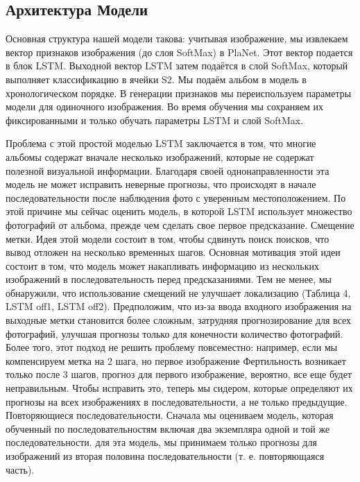 \subsection{Архитектура Модели}
Основная структура нашей модели такова:
учитывая изображение, мы извлекаем вектор признаков изображения (до слоя SoftMax) в PlaNet. Этот вектор подается в блок LSTM. Выходной вектор LSTM затем подаётся в слой SoftMax, который
выполняет классификацию в ячейки S2. Мы подаём альбом в модель в хронологическом порядке. В генерации признаков мы переиспользуем параметры модели для одиночного изображения. Во время обучения мы сохраняем их фиксированными и только обучать параметры LSTM и слой SoftMax.


Проблема с этой простой моделью LSTM заключается в том, что многие
альбомы содержат вначале несколько изображений, которые
не содержат полезной визуальной информации. Благодаря своей однонаправленности эта модель не может исправить неверные прогнозы, что
происходят в начале последовательности после наблюдения
фото с уверенным местоположением. По этой причине мы сейчас
оценить модель, в которой LSTM использует множество фотографий
от альбома, прежде чем сделать свое первое предсказание.
Смещение метки. Идея этой модели состоит в том, чтобы сдвинуть 
поиск поисков, что вывод отложен на несколько временных шагов. Основная мотивация этой идеи состоит в том, что
модель может накапливать информацию из нескольких изображений в
последовательность перед предсказаниями. Тем не менее, мы
обнаружили, что использование смещений не улучшает локализацию
(Таблица 4, LSTM off1, LSTM off2). Предположим, что
из-за ввода входного изображения на выходные метки
становится более сложным, затрудняя прогнозирование
для всех фотографий, улучшая прогнозы только для конечности
количество фотографий. Более того, этот подход не
решить проблему повсеместно: например, если мы компенсируем
метка на 2 шага, но первое изображение
Фертильность возникает только после 3 шагов, прогноз для первого
изображение, вероятно, все еще будет неправильным. Чтобы исправить это, теперь мы сидером, которые определяют их прогнозы на всех изображениях
в последовательности, а не только предыдущие. Повторяющиеся последовательности. Сначала мы оцениваем модель, которая
обученный по последовательностям
включая два экземпляра одной и той же последовательности. для эта модель, мы принимаем только прогнозы для изображений из вторая половина последовательности (т. е. повторяющаяся часть).

